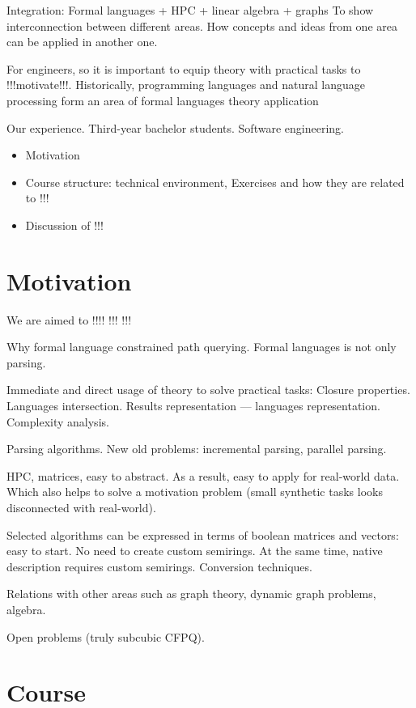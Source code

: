 \documentclass[sigconf]{acmart}
\begin{document}
Integration: Formal languages + HPC + linear algebra + graphs To show interconnection between different areas. How concepts and ideas from one area can be applied in another one. 

For engineers, so it is important to equip theory with practical tasks to !!!motivate!!!. Historically, programming languages and natural language processing form an area of formal languages theory application 

Our experience. Third-year bachelor students. Software engineering.
\begin{itemize}
  \item Motivation
  \item Course structure: technical environment, Exercises and how they are related to !!!
  \item Discussion of !!!
\end{itemize}  

\section{Motivation}

We are aimed to !!!! !!! !!! 

Why formal language constrained path querying. Formal languages is not only parsing. 

Immediate and direct usage of theory to solve practical tasks: Closure properties. Languages intersection.  Results representation --- languages representation. Complexity analysis.

Parsing algorithms. New old problems: incremental parsing, parallel parsing.

HPC, matrices, easy to abstract. As a result, easy to apply for real-world data. Which also helps to solve a motivation problem (small synthetic tasks looks disconnected with real-world).

Selected algorithms can be expressed in terms of boolean matrices and vectors: easy to start. No need to create custom semirings. At the same time, native description requires custom semirings. Conversion techniques.

Relations with other areas such as graph theory, dynamic graph problems, algebra.

Open problems (truly subcubic CFPQ).

\section{Course}
\end{document}
